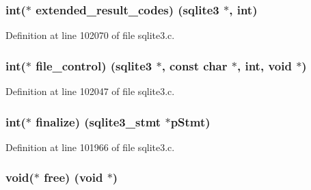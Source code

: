 \subsubsection[{extended\+\_\+result\+\_\+codes}]{\setlength{\rightskip}{0pt plus 5cm}int($\ast$ extended\+\_\+result\+\_\+codes) ({\bf sqlite3} $\ast$, int)}\label{structsqlite3__api__routines_a96808678170875483108bb329d07e025}


Definition at line 102070 of file sqlite3.\+c.

\hypertarget{structsqlite3__api__routines_a0b02da5c8741506c6c10c3a4cf6b768b}{}
\subsubsection[{file\+\_\+control}]{\setlength{\rightskip}{0pt plus 5cm}int($\ast$ file\+\_\+control) ({\bf sqlite3} $\ast$, const char $\ast$, int, void $\ast$)}\label{structsqlite3__api__routines_a0b02da5c8741506c6c10c3a4cf6b768b}


Definition at line 102047 of file sqlite3.\+c.

\hypertarget{structsqlite3__api__routines_adf6d460eae9a5dd4edef98a6f0bcfabb}{}
\subsubsection[{finalize}]{\setlength{\rightskip}{0pt plus 5cm}int($\ast$ finalize) ({\bf sqlite3\+\_\+stmt} $\ast$p\+Stmt)}\label{structsqlite3__api__routines_adf6d460eae9a5dd4edef98a6f0bcfabb}


Definition at line 101966 of file sqlite3.\+c.

\hypertarget{structsqlite3__api__routines_a00cac9e5111cbc007e391e5017fa5af5}{}
\subsubsection[{free}]{\setlength{\rightskip}{0pt plus 5cm}void($\ast$ free) (void $\ast$)}\label{structsqlite3__api__routines_a00cac9e5111cbc007e391e5017fa5af5}



